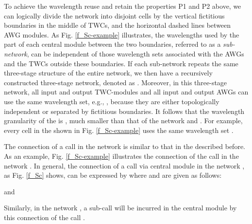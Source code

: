 \documentclass[journal]{IEEEtran}
\begin{document}
To achieve the wavelength reuse and retain the properties P1 and P2
above, we can logically divide the network into disjoint cells by
the vertical fictitious boundaries in the middle of TWCs, and the
horizontal dashed lines between AWG modules. As Fig.
\ref{f_Sc-example} illustrates, the wavelengths used by the part of
each central module between the two boundaries, referred to as a
\emph{sub-network}, can be independent of those wavelength sets
associated with the AWGs and the TWCs outside these boundaries. If
each sub-network repeats the same three-stage structure of the
entire network, we then have a recursively constructed three-stage
network, denoted as . Moreover, in this
three-stage network, all input and output TWC-modules and all input
and output AWGs can use the same wavelength set, e.g.,
, because they are
either topologically independent or separated by fictitious
boundaries. It follows that the wavelength granularity of the
 is , much smaller than that of the
network  and
. For example, every cell in the
 shown in Fig. \ref{f_Sc-example} uses the
same wavelength set .

The connection of a call in the network 
is similar to that in the  described
before. As an example, Fig. \ref{f_Sc-example} illustrates the
connection of the call  in the network
. In general, the connection of a call
 via central module  in
the network , as Fig. \ref{f_Sc} shows,
can be expressed by
 where 
and  are given as follows:

and

Similarly, in the network , a sub-call
 will be incurred in the central
module  by this connection of the call
.
\end{document}
